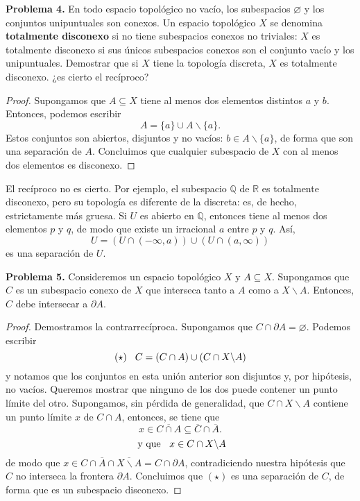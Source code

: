 \documentclass{article}
\begin{document}
\begin{mybox}
	\textbf{Problema 4. } En todo espacio topológico no vacío, los subespacios $\varnothing$ y los conjuntos unipuntuales son conexos. Un espacio topológico $X$ se denomina \textbf{totalmente disconexo} si no tiene subespacios conexos no triviales: $X$ es totalmente disconexo si sus únicos subespacios conexos son el conjunto vacío y los unipuntuales.  Demostrar que si $X$ tiene la topología discreta, $X$ es totalmente disconexo. ¿es cierto el recíproco?
\end{mybox}	
\begin{proof}
	Supongamos que $A \subseteq X$ tiene al menos dos elementos distintos $a$  y $b$. Entonces, podemos escribir
	$$ A = \{ a \} \cup A \backslash \{ a \} .$$
	Estos conjuntos son abiertos, disjuntos y no vacíos: $b \in A \backslash \{ a \}$, de forma que son una separación de $A$. Concluimos que cualquier subespacio de $X$ con al menos dos elementos es disconexo.  
	
\end{proof}	

El recíproco no es cierto. Por ejemplo, el subespacio $\mathbb{Q}$ de $\mathbb{R}$ es totalmente disconexo, pero su topología es diferente de la discreta: es, de hecho, estrictamente más gruesa. Si $U$ es abierto en  $\mathbb{Q}$, entonces tiene al menos dos elementos $p$ y $q$, de modo que existe un irracional $a$ entre $p$ y $q$. Así, 
$$ U = \left( U \cap (- \infty, a) \right) \cup \left( U \cap (a, \infty) \right) $$
es una separación de $U$. 

\begin{mybox}
	\textbf{Problema 5. } Consideremos un espacio topológico $X$ y $A \subseteq X$. Supongamos que $C$ es un subespacio conexo de $X$ que interseca tanto a $A$ como a $X \backslash A$. Entonces, $C$ debe intersecar a $\partial A$. 
\end{mybox}	
\begin{proof}
	Demostramos la contrarrecíproca. Supongamos que $C \cap \partial A = \varnothing. $ Podemos escribir
	$$(\star) \hspace{0.3cm} C = (C \cap A) \cup (C \cap X \backslash A) $$
	y notamos que los conjuntos en esta unión anterior son disjuntos y, por hipótesis, no vacíos. Queremos mostrar que ninguno de los dos puede contener un punto límite del otro. Supongamos, sin pérdida de generalidad, que $C \cap X \backslash A $ contiene un punto límite $x$ de $C \cap A$, entonces, se tiene que 
	$$ x \in \overline{C \cap A} \subseteq \overline{C} \cap \overline{A} .$$
	$$ \text{ y que } \hspace{0.2cm} x \in C \cap X \backslash A $$
	de modo que $x \in C \cap \overline{A} \cap \overline{X \backslash A} = C \cap \partial A$,
	contradiciendo nuestra hipótesis que $C$ no interseca la frontera $\partial A$. Concluimos que $(\star)$ es una separación de $C$, de forma que es un subespacio disconexo. 
\end{proof}
\end{document}
